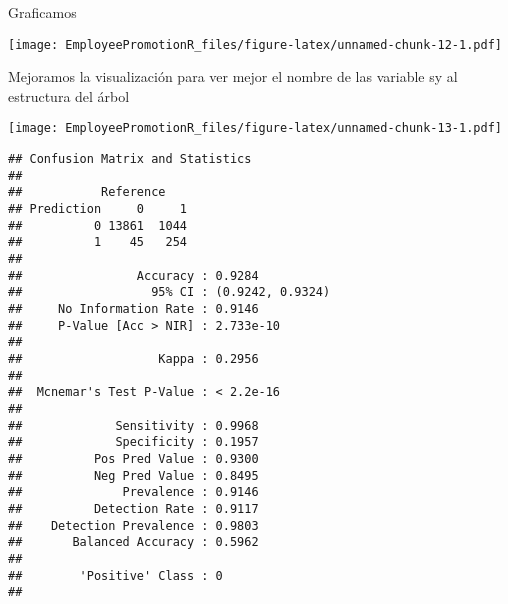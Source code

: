 \documentclass[
]{article}
\newenvironment{Shaded}{\begin{snugshade}}{\end{snugshade}}
\newcommand{\AttributeTok}[1]{\textcolor[rgb]{0.77,0.63,0.00}{#1}}
\newcommand{\ConstantTok}[1]{\textcolor[rgb]{0.00,0.00,0.00}{#1}}
\newcommand{\DecValTok}[1]{\textcolor[rgb]{0.00,0.00,0.81}{#1}}
\newcommand{\FunctionTok}[1]{\textcolor[rgb]{0.00,0.00,0.00}{#1}}
\newcommand{\NormalTok}[1]{#1}
\newcommand{\OtherTok}[1]{\textcolor[rgb]{0.56,0.35,0.01}{#1}}
\newcommand{\SpecialCharTok}[1]{\textcolor[rgb]{0.00,0.00,0.00}{#1}}
\newcommand{\StringTok}[1]{\textcolor[rgb]{0.31,0.60,0.02}{#1}}
\begin{document}
Graficamos

\begin{Shaded}
\end{Shaded}

\texttt{[image: EmployeePromotionR\_files/figure-latex/unnamed-chunk-12-1.pdf]}

Mejoramos la visualización para ver mejor el nombre de las variable sy
al estructura del árbol

\begin{Shaded}
\end{Shaded}

\texttt{[image: EmployeePromotionR\_files/figure-latex/unnamed-chunk-13-1.pdf]}

\begin{Shaded}
\end{Shaded}

\begin{verbatim}
## Confusion Matrix and Statistics
## 
##           Reference
## Prediction     0     1
##          0 13861  1044
##          1    45   254
##                                           
##                Accuracy : 0.9284          
##                  95% CI : (0.9242, 0.9324)
##     No Information Rate : 0.9146          
##     P-Value [Acc > NIR] : 2.733e-10       
##                                           
##                   Kappa : 0.2956          
##                                           
##  Mcnemar's Test P-Value : < 2.2e-16       
##                                           
##             Sensitivity : 0.9968          
##             Specificity : 0.1957          
##          Pos Pred Value : 0.9300          
##          Neg Pred Value : 0.8495          
##              Prevalence : 0.9146          
##          Detection Rate : 0.9117          
##    Detection Prevalence : 0.9803          
##       Balanced Accuracy : 0.5962          
##                                           
##        'Positive' Class : 0               
## 
\end{verbatim}
\end{document}
